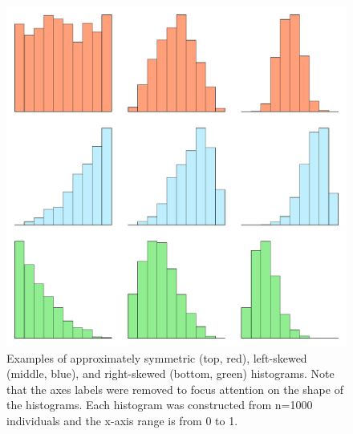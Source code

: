 \documentclass[10pt,openany]{book}\usepackage[]{graphicx}\usepackage[]{color}
\newenvironment{knitrout}{}{} %
\begin{document}
\begin{knitrout}
\color{fgcolor}\begin{figure}[hbtp]

{\centering \includegraphics[width=.7\linewidth]{Figs/ShapeExamples-1} 

}

\caption[Examples of approximately symmetric (top, red), left-skewed (middle, blue), and right-skewed (bottom, green) histograms]{Examples of approximately symmetric (top, red), left-skewed (middle, blue), and right-skewed (bottom, green) histograms.  Note that the axes labels were removed to focus attention on the shape of the histograms.  Each histogram was constructed from n=1000 individuals and the x-axis range is from 0 to 1.}\label{fig:ShapeExamples}
\end{figure}


\end{knitrout}


\vspace{-12pt}

\vspace{-12pt}

\vspace{-12pt}
\end{document}
